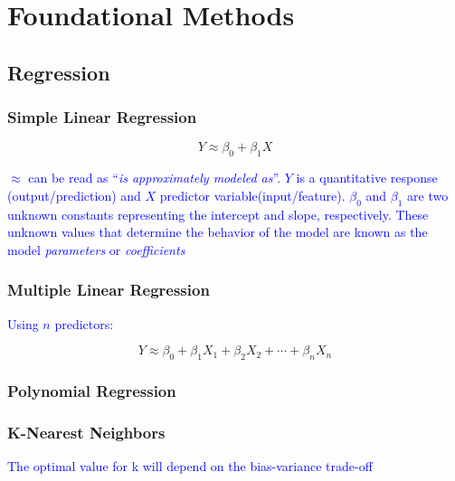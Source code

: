 \chapter{Foundational Methods}

\section{Regression}

\subsection{Simple Linear Regression}


\begin{equation}
{Y \approx \beta_0 + \beta_1 X}
\label{eq:slr_ex}
\end{equation}

\textcolor{blue}{$\approx$ can be read as ``\emph{is approximately modeled as}''. $Y$ is a quantitative response (output/prediction) and $X$ predictor variable(input/feature). $\beta_0$ and $\beta_1$ are two unknown constants representing the intercept and slope, respectively. These unknown values that determine the behavior of the model are known as the model \emph{parameters} or \emph{coefficients}}


\subsection{Multiple Linear Regression}

\textcolor{blue}{Using $n$ predictors:}

\begin{equation}
{Y \approx \beta_0 + \beta_1 X_1 + \beta_2 X_2 + \cdots + \beta_n X_n}
\label{eq:mlr_ex}
\end{equation}


\subsection{Polynomial Regression}



\subsection{K-Nearest Neighbors}

\textcolor{blue}{The optimal value for k will depend on the bias-variance trade-off}

